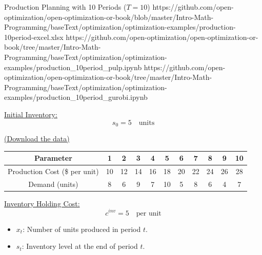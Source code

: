 \begin{examplewithallcode}{Production Planning with 10 Periods (\(T = 10\))}
{https://github.com/open-optimization/open-optimization-or-book/blob/master/Intro-Math-Programming/baseText/optimization/optimization-examples/production-10period-excel.xlsx}
{https://github.com/open-optimization/open-optimization-or-book/tree/master/Intro-Math-Programming/baseText/optimization/optimization-examples/production_10period_pulp.ipynb}
{https://github.com/open-optimization/open-optimization-or-book/tree/master/Intro-Math-Programming/baseText/optimization/optimization-examples/production_10period_gurobi.ipynb}
\label{ex:production-10period}

\underline{Initial Inventory:}
\[
s_0 = 5 \quad \text{units}
\]

\href{https://github.com/open-optimization/open-optimization-or-book/blob/master/Intro-Math-Programming/baseText/optimization/optimization-examples/production-planning-data.xlsx}{(Download the data)}
\begin{center}
\begin{tabular}{@{}c*{10}{c}@{}}
\toprule
\textbf{Parameter}               & 1  & 2  & 3  & 4  & 5  & 6  & 7  & 8  & 9  & 10 \\ \midrule
Production Cost (\$ per unit)    & 10 & 12 & 14 & 16 & 18 & 20 & 22 & 24 & 26 & 28 \\
Demand (units)                   & 8  & 6  & 9  & 7  & 10 & 5  & 8  & 6  & 4  & 7  \\
\bottomrule
\end{tabular}
\par{}\label{tab:modeling-sums-tab01}%

\end{center}

\underline{Inventory Holding Cost:}
\[
c^{inv} = 5 \quad \text{per unit}
\]

\begin{itemize}
    \item \(x_t\): Number of units produced in period \(t\).
    \item \(s_t\): Inventory level at the end of period \(t\).
\end{itemize}


\end{examplewithallcode}
